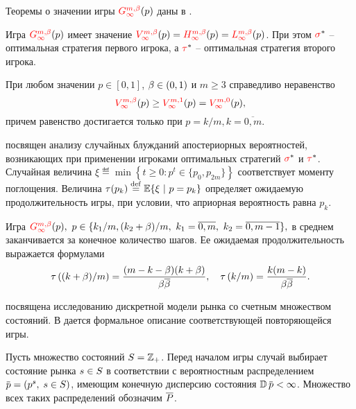 Теоремы о значении игры $\theG*{\infty}(p)$ даны в .
\begin{theorem}
  Игра $\theG*{\infty}(p)$ имеет значение $\V*{\infty}(p) = \H*{\infty}(p) = \L*{\infty}(p)$.
  При этом $\textcolor{red}{\sigma}^*$ -- оптимальная стратегия первого игрока\textup{,} а $\textcolor{red}{\tau}^*$ -- оптимальная стратегия второго игрока.
\end{theorem}

\begin{theorem}
  При любом значении $p \in [0,1]$, $\beta \in (0,1)$ и $m \geq 3$ справедливо неравенство
  \begin{equation*}
    \V*[\Co]{\infty}(p) \geq \V*[1]{\infty}(p) = \V*[0]{\infty}(p),
  \end{equation*}
  причем равенство достигается только при $p = k/m, k = \overline{0,m}$.
\end{theorem}

 посвящен анализу случайных блужданий апостериорных вероятностей, возникающих при применении игроками оптимальных стратегий $\textcolor{red}{\sigma}^*$ и $\textcolor{red}{\tau}^*$.
Случайная величина
$
  \xi \eqdef \min \left\{ t \geq 0: p^t \in \{p_0, p_{2m}\} \right\}
$
соответствует моменту поглощения.
Величина
$
  \tau(p_k) \overset{\mathrm{def}}{=} \operatorname{\mathbb{E}} \{ \xi\ |\ p = p_k \}
$
определяет ожидаемую продолжительность игры, при условии, что априорная вероятность равна $p_k$.

\begin{theorem}
  Игра $\theG*{\infty}(p),\ p \in \{k_1/m, (k_2+\Co)/m,\ k_1 = \overline{0,m},\ k_2 = \overline{0,m-1}\},$ в среднем заканчивается за конечное количество шагов.
  Ее ожидаемая продолжительность выражается формулами
  \begin{equation*} 
    \tau\left( (k+\beta)/m \right) = \frac{(m-k-\beta)(k+\beta)}{\beta {{\overline{\beta}}}},\quad
    \tau\left( k/m \right) = \frac{k(m-k)}{\beta {{\overline{\beta}}}}.
  \end{equation*}
\end{theorem}

 посвящена исследованию дискретной модели рынка со счетным множеством состояний.
В  дается формальное описание соответствующей повторяющейся игры.

Пусть множество состояний $S = \mathbb{Z}_+$.
Перед началом игры случай выбирает состояние рынка $s \in S$ в соответствии с вероятностным распределением $\p = (p^s, \; s \in S)$, имеющим конечную дисперсию состояния $\D \p < \infty$.
Множество всех таких распределений обозначим $\overline{P}$.

